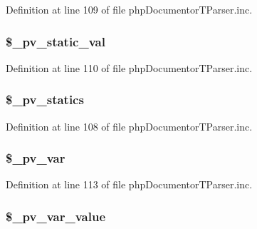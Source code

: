 \-Definition at line 109 of file php\-Documentor\-T\-Parser.\-inc.

\hypertarget{classphp_documentor_t_parser_aa1ab19abbf58b38a925e8b8f5714facb}{
\subsubsection[{\$\-\_\-pv\-\_\-static\-\_\-val}]{\setlength{\rightskip}{0pt plus 5cm}\$\-\_\-pv\-\_\-static\-\_\-val}}\label{classphp_documentor_t_parser_aa1ab19abbf58b38a925e8b8f5714facb}


\-Definition at line 110 of file php\-Documentor\-T\-Parser.\-inc.

\hypertarget{classphp_documentor_t_parser_acdb2ae1a51ed7bacdff8ae9e96655d55}{
\subsubsection[{\$\-\_\-pv\-\_\-statics}]{\setlength{\rightskip}{0pt plus 5cm}\$\-\_\-pv\-\_\-statics}}\label{classphp_documentor_t_parser_acdb2ae1a51ed7bacdff8ae9e96655d55}


\-Definition at line 108 of file php\-Documentor\-T\-Parser.\-inc.

\hypertarget{classphp_documentor_t_parser_a397800844a3257600e13926c3e1a9677}{
\subsubsection[{\$\-\_\-pv\-\_\-var}]{\setlength{\rightskip}{0pt plus 5cm}\$\-\_\-pv\-\_\-var}}\label{classphp_documentor_t_parser_a397800844a3257600e13926c3e1a9677}


\-Definition at line 113 of file php\-Documentor\-T\-Parser.\-inc.

\hypertarget{classphp_documentor_t_parser_a7d0fedac92de56941f5d85a60cf88b4c}{
\subsubsection[{\$\-\_\-pv\-\_\-var\-\_\-value}]{\setlength{\rightskip}{0pt plus 5cm}\$\-\_\-pv\-\_\-var\-\_\-value}}\label{classphp_documentor_t_parser_a7d0fedac92de56941f5d85a60cf88b4c}


